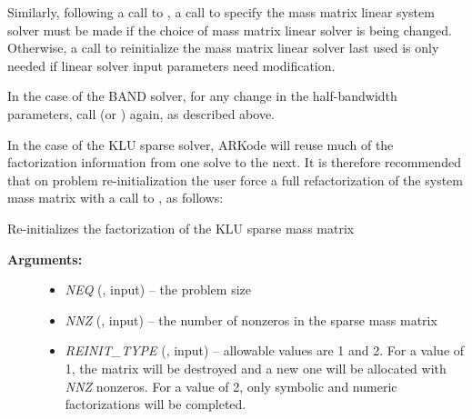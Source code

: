 \documentclass[letterpaper,10pt,english]{sphinxmanual}
\begin{document}
Similarly, following a call to {\hyperref[f_interface/Usage:f/_/FARKREINIT]{\emph{}}}, a call to
specify the mass matrix linear system solver must be made if the
choice of mass matrix linear solver is being changed.  Otherwise, a
call to reinitialize the mass matrix linear solver last used is only
needed if linear solver input parameters need modification.

In the case of the BAND solver, for any change in the
half-bandwidth parameters, call {\hyperref[f_interface/Usage:f/_/FARKMASSBAND]{\emph{}}} (or
{\hyperref[f_interface/Usage:f/_/FARKMASSLAPACKBAND]{\emph{}}}) again, as described above.

In the case of the KLU sparse solver, ARKode will reuse much of the
factorization information from one solve to the next.  It is therefore
recommended that on problem re-initialization the user force a full
refactorization of the system mass matrix with a call to
{\hyperref[f_interface/Usage:f/_/FARKMASSKLUREINIT]{\emph{}}}, as follows:

\begin{fulllineitems}
\label{f_interface/Usage:f/_/FARKMASSKLUREINIT}
Re-initializes the factorization of the KLU sparse mass matrix
\begin{description}
\item[{\textbf{Arguments:}}] \leavevmode\begin{itemize}
\item {} 
\emph{NEQ} (, input) -- the problem size

\item {} 
\emph{NNZ} (, input) -- the number of nonzeros in the
sparse mass matrix

\item {} 
\emph{REINIT\_TYPE} (, input) -- allowable values are 1
and 2.  For a value of 1, the matrix will be destroyed and a
new one will be allocated with \emph{NNZ} nonzeros.  For a value of
2, only symbolic and numeric factorizations will be completed.

\end{itemize}

\end{description}

\end{fulllineitems}
\end{document}
